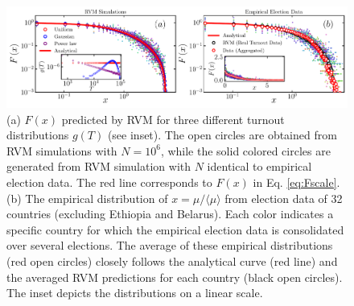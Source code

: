 \documentclass[reprint,aps,prl,showpacs,twocolumn, superscriptaddress]{revtex4-2}
\begin{document}
\begin{figure}[t]
    \centering
    \includegraphics[width=\textwidth]{fig_3.pdf}
    \caption{(a) $F(x)$ predicted by RVM for three different turnout distributions $g(T)$ (see inset). The open circles are obtained from RVM simulations with $N = 10^6$, while the solid colored circles are generated from RVM simulation with $N$ identical to empirical election data. The red line corresponds to $F(x)$ in Eq. \ref{eq:Fscale}. (b) The empirical distribution of $x=\mu/\langle \mu \rangle$ from election data of 32 countries (excluding Ethiopia and Belarus). Each color indicates a specific country for which the empirical election data is consolidated over several elections. The average of these empirical distributions (red open circles) closely follows the analytical curve (red line) and the averaged RVM predictions for each country (black open circles). The inset depicts the distributions on a linear scale.}
    \label{fig_3}
\end{figure}
\end{document}
